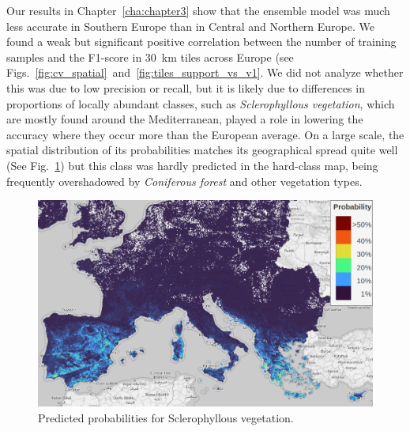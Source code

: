         Our results in Chapter\@~\ref{cha:chapter3} show that the ensemble model was much less accurate in Southern Europe than in Central and Northern Europe. We found a weak but significant positive correlation between the number of training samples and the F1-score in 30~km tiles across Europe (see Figs.\@~\ref{fig:cv_spatial}\@~and\@~\ref{fig:tiles_support_vs_v1}. We did not analyze whether this was due to low precision or recall, but it is likely due to differences in proportions of locally abundant classes, such as \textit{Sclerophyllous vegetation}, which are mostly found around the Mediterranean, played a role in lowering the accuracy where they occur more than the European average. On a large scale, the spatial distribution of its probabilities matches its geographical spread quite well (See Fig.\@~\ref{fig:sclerophyllous}) but this class was hardly predicted in the hard-class map, being frequently overshadowed by \textit{Coniferous forest} and other vegetation types.  

        \begin{figure}[H]
        \centering
        \includegraphics[width=1\linewidth]{figs_06/sclerophyllous.png}
        \caption{Predicted probabilities for Sclerophyllous vegetation.}
        \label{fig:sclerophyllous}
        \end{figure}
        
